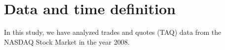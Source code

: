 \section{Data and time definition}

In this study, we have analyzed trades and quotes (TAQ) data from the NASDAQ
Stock Market in the year 2008. 